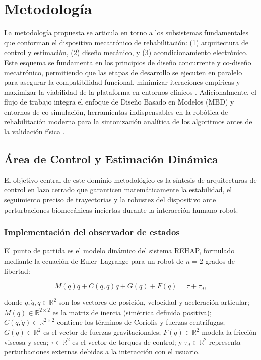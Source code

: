 \documentclass[a4paper,12pt]{article}
\begin{document}
\newpage

\section{Metodología}

La metodología propuesta se articula en torno a los subsistemas fundamentales que conforman el dispositivo mecatrónico de rehabilitación: (1) arquitectura de control y estimación, (2) diseño mecánico, y (3) acondicionamiento electrónico. Este esquema se fundamenta en los principios de diseño concurrente y co-diseño mecatrónico, permitiendo que las etapas de desarrollo se ejecuten en paralelo para asegurar la compatibilidad funcional, minimizar iteraciones empíricas y maximizar la viabilidad de la plataforma en entornos clínicos \citep{chhabra_holistic_2009, park_concurrent_2001, cruz_methodology_2017}. Adicionalmente, el flujo de trabajo integra el enfoque de Diseño Basado en Modelos (MBD) y entornos de co-simulación, herramientas indispensables en la robótica de rehabilitación moderna para la sintonización analítica de los algoritmos antes de la validación física \citep{gil_model-based_2025, mazumder_next_2023}.

\subsection{Área de Control y Estimación Dinámica}

El objetivo central de este dominio metodológico es la síntesis de arquitecturas de control en lazo cerrado que garanticen matemáticamente la estabilidad, el seguimiento preciso de trayectorias y la robustez del dispositivo ante perturbaciones biomecánicas inciertas durante la interacción humano-robot.

\subsubsection{Implementación del observador de estados}
\label{sec:obs_hgo}

El punto de partida es el modelo dinámico del sistema REHAP, formulado mediante la ecuación de Euler–Lagrange para un robot de $n=2$ grados de libertad:

\begin{equation}
    M(q)\ddot{q} + C(q,\dot{q})\dot{q} + G(q) + F(\dot{q}) = \tau + \tau_d,
    \label{eq:dinamica}
\end{equation}

\noindent donde $q,\dot{q},\ddot{q}\in\mathbb{R}^{2}$ son los vectores de posición, velocidad y aceleración articular; $M(q)\in\mathbb{R}^{2\times 2}$ es la matriz de inercia (simétrica definida positiva); $C(q,\dot{q})\in\mathbb{R}^{2\times 2}$ contiene los términos de Coriolis y fuerzas centrífugas; $G(q)\in\mathbb{R}^{2}$ es el vector de fuerzas gravitacionales; $F(\dot{q})\in\mathbb{R}^{2}$ modela la fricción viscosa y seca; $\tau\in\mathbb{R}^{2}$ es el vector de torques de control; y $\tau_d\in\mathbb{R}^{2}$ representa perturbaciones externas debidas a la interacción con el usuario.
\end{document}
